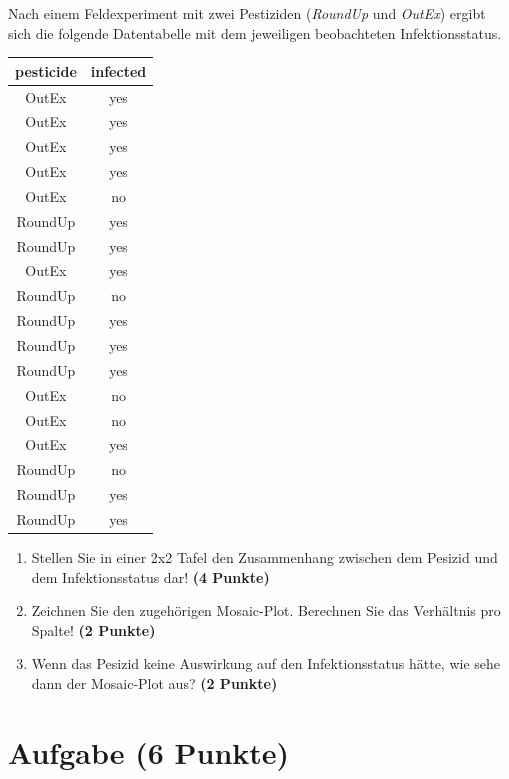\documentclass[a4paper, 10pt]{scrartcl}\usepackage[]{graphicx}\usepackage[]{color}
\begin{document}
Nach einem Feldexperiment mit zwei Pestiziden (\textit{RoundUp} und
\textit{OutEx}) ergibt sich die folgende Datentabelle mit dem jeweiligen
beobachteten Infektionsstatus.

\begin{table}[!h]
\centering
\begin{tabular}{cc}
\toprule
pesticide & infected\\
\midrule
OutEx & yes\\
OutEx & yes\\
OutEx & yes\\
OutEx & yes\\
OutEx & no\\
\addlinespace
RoundUp & yes\\
RoundUp & yes\\
OutEx & yes\\
RoundUp & no\\
RoundUp & yes\\
\addlinespace
RoundUp & yes\\
RoundUp & yes\\
OutEx & no\\
OutEx & no\\
OutEx & yes\\
\addlinespace
RoundUp & no\\
RoundUp & yes\\
RoundUp & yes\\
\bottomrule
\end{tabular}
\end{table}



\begin{enumerate}
\item Stellen Sie in einer 2x2 Tafel den Zusammenhang zwischen dem
  Pesizid und dem Infektionsstatus dar! \textbf{(4 Punkte)}
\item Zeichnen Sie den zugeh{\"o}rigen Mosaic-Plot. Berechnen Sie das
  Verh{\"a}ltnis pro Spalte! \textbf{(2 Punkte)}
\item Wenn das Pesizid keine Auswirkung auf den Infektionsstatus h{\"a}tte, wie
  sehe dann der Mosaic-Plot aus? \textbf{(2 Punkte)}
\end{enumerate} 
\clearpage

\section{Aufgabe \hfill (6 Punkte)}
\end{document}
